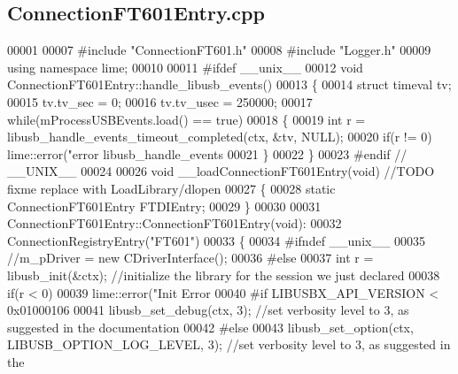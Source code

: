 \subsection{Connection\+F\+T601\+Entry.\+cpp}
\label{ConnectionFT601Entry_8cpp_source}

\begin{DoxyCode}
00001 
00007 \textcolor{preprocessor}{#include "ConnectionFT601.h"}
00008 \textcolor{preprocessor}{#include "Logger.h"}
00009 \textcolor{keyword}{using namespace }lime;
00010 
00011 \textcolor{preprocessor}{#ifdef \_\_unix\_\_}
00012 \textcolor{keywordtype}{void} ConnectionFT601Entry::handle\_libusb\_events()
00013 \{
00014     \textcolor{keyword}{struct }timeval tv;
00015     tv.tv\_sec = 0;
00016     tv.tv\_usec = 250000;
00017     \textcolor{keywordflow}{while}(mProcessUSBEvents.load() == \textcolor{keyword}{true})
00018     \{
00019         \textcolor{keywordtype}{int} r = libusb\_handle\_events\_timeout\_completed(ctx, &tv, NULL);
00020         \textcolor{keywordflow}{if}(r != 0) lime::error(\textcolor{stringliteral}{"error libusb\_handle\_events %
00021     \}
00022 \}
00023 \textcolor{preprocessor}{#endif // \_\_UNIX\_\_}
00024 
00026 \textcolor{keywordtype}{void} __loadConnectionFT601Entry(\textcolor{keywordtype}{void}) \textcolor{comment}{//TODO fixme replace with LoadLibrary/dlopen}
00027 \{
00028     \textcolor{keyword}{static} ConnectionFT601Entry FTDIEntry;
00029 \}
00030 
00031 ConnectionFT601Entry::ConnectionFT601Entry(\textcolor{keywordtype}{void}):
00032     ConnectionRegistryEntry(\textcolor{stringliteral}{"FT601"})
00033 \{
00034 \textcolor{preprocessor}{#ifndef \_\_unix\_\_}
00035     \textcolor{comment}{//m\_pDriver = new CDriverInterface();}
00036 \textcolor{preprocessor}{#else}
00037     \textcolor{keywordtype}{int} r = libusb\_init(&ctx); \textcolor{comment}{//initialize the library for the session we just declared}
00038     \textcolor{keywordflow}{if}(r < 0)
00039         lime::error(\textcolor{stringliteral}{"Init Error %
00040 \textcolor{preprocessor}{#if LIBUSBX\_API\_VERSION < 0x01000106}
00041     libusb\_set\_debug(ctx, 3); \textcolor{comment}{//set verbosity level to 3, as suggested in the documentation}
00042 \textcolor{preprocessor}{#else}
00043     libusb\_set\_option(ctx, LIBUSB\_OPTION\_LOG\_LEVEL, 3); \textcolor{comment}{//set verbosity level to 3, as suggested in the
}}}
\end{DoxyCode}
